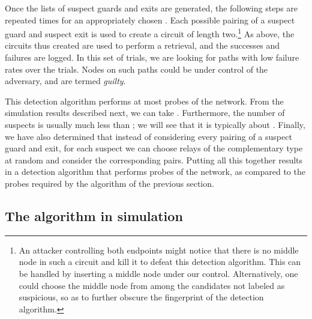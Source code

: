 \documentclass[]{lmcs}
\begin{document}
Once the lists of suspect guards and exits 
are generated, the following steps are
repeated  times for an appropriately chosen
.  Each possible pairing of a suspect guard and suspect exit is used
to create a circuit of length two.\footnote{An attacker controlling both
endpoints might notice that there is no middle node in such a circuit and 
kill it to defeat this detection algorithm.  This can be handled by inserting a
middle node under our control.  Alternatively, one could choose the
middle node from among the candidates not labeled as suspicious, so
as to further obscure the fingerprint of the detection algorithm.}
As above, the circuits thus
created are used to perform a retrieval, and the successes and
failures are logged.  In this set of trials, we are looking for paths
with low failure rates over the  trials.  Nodes on such paths
could be under control of the adversary, and are termed
\textit{guilty}.  

This detection algorithm performs at most  probes
of the network.  From the simulation results described next, we can
take .  Furthermore, the number of suspects is usually
much less than ; we will see that it is typically about .  Finally,
we have also determined that instead of considering every pairing of a suspect
guard and exit, for each suspect we can choose  relays of
the complementary type at random and consider the  corresponding pairs.
Putting all this together results in a detection algorithm that performs
 probes of the network, as compared to the  probes required
by the algorithm of the previous section.


\subsection{The algorithm in simulation}
\end{document}
